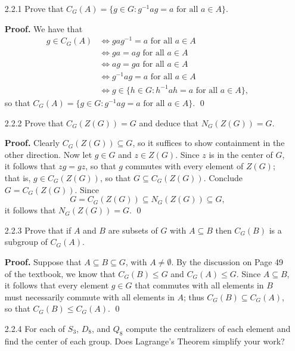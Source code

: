 \begin{enumerate}
   \item[2.2.1]   Prove that
                  $C_G(A) = \{g \in G : g^{-1}ag = a \text{ for all } a\in A\}$.

      \textbf{Proof.} We have that
      \begin{align*}
         g \in C_G(A) &\Longleftrightarrow gag^{-1}=a \text{ for all } a\in A \\
             &\Longleftrightarrow ga = ag \text{ for all } a\in A \\
             &\Longleftrightarrow ag = ga \text{ for all } a\in A \\
             &\Longleftrightarrow g^{-1}ag = a \text{ for all } a\in A \\
             &\Longleftrightarrow g \in \{h \in G : h^{-1}ah = a
              \text{ for all } a\in A\},
      \end{align*}
      so that $C_G(A) = \{g \in G : g^{-1}ag = a\text{ for all } a\in A\}$. \qed
   \item[2.2.2]   Prove that $C_G(Z(G)) = G$ and deduce that $N_G(Z(G)) = G$.

      \textbf{Proof.} Clearly $C_G(Z(G)) \subseteq G$, so it suffices to show
      containment in the other direction. Now let $g \in G$ and $z \in Z(G)$. 
      Since $z$ is in the center of $G$, it follows that $zg = gz$, so that $g$ 
      commutes with every element of $Z(G)$; that is, $g \in C_G(Z(G))$, so that
      $G \subseteq C_G(Z(G))$. Conclude $G = C_G(Z(G))$. Since
      $$G = C_G(Z(G)) \subseteq N_G(Z(G)) \subseteq G,$$
      it follows that $N_G(Z(G)) = G$. \qed
   \item[2.2.3]   Prove that if $A$ and $B$ are subsets of $G$ with
                  $A \subseteq B$ then $C_G(B)$ is a subgroup of $C_G(A)$.

      \textbf{Proof.} Suppose that $A \subseteq B \subseteq G$, with
      $A \neq \emptyset$. By the discussion on Page 49 of the textbook, we know
      that $C_G(B) \le G$ and $C_G(A) \le G$. Since $A \subseteq B$, it follows
      that every element $g \in G$ that commutes with all elements in $B$ must
      necessarily commute with all elements in $A$; thus
      $C_G(B) \subseteq C_G(A)$, so that $C_G(B) \le C_G(A)$. \qed
   \item[2.2.4]   For each of $S_3$, $D_8$, and $Q_8$ compute the centralizers
                  of each element and find the center of each group. Does
                  Lagrange's Theorem simplify your work?


\end{enumerate}
